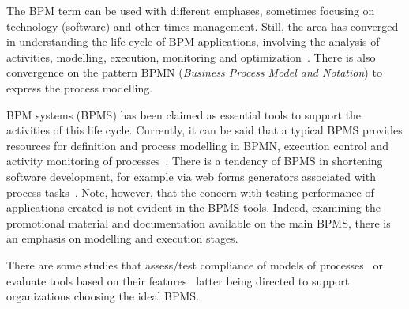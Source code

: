 \documentclass[runningheads,a4paper]{llncs}
\begin{document}

The BPM term can be used with different emphases, sometimes focusing on technology (software) and other times management. Still, the area has converged in understanding the life cycle of BPM applications, involving the analysis of activities, modelling, execution, monitoring and optimization~\cite{ABPMP}. There is also convergence on the pattern BPMN (\emph{Business Process Model and Notation}) to express the process modelling. 


BPM systems (BPMS) has been claimed as essential tools to support the activities of this life cycle. Currently, it can be said that a typical BPMS provides resources for definition and process modelling in BPMN, execution control and activity monitoring of processes~\cite{forrester}. There is a tendency of BPMS in shortening software development, for example via web forms generators associated with process tasks~\cite{greenresearch}. Note, however, that the concern with testing performance of applications created is not evident in the BPMS tools. Indeed, examining the promotional material and documentation available on the main BPMS, there is an emphasis on modelling and execution stages. 

There are some  studies that assess/test compliance of models of processes~\cite{conformancetesting} 
or evaluate tools based on their features~\cite{comparingbpms} latter being directed to support organizations choosing the ideal BPMS. 
\end{document}
